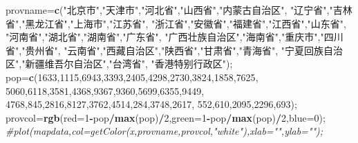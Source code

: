 \documentclass[]{article}
\newenvironment{Shaded}{\begin{snugshade}}{\end{snugshade}}
\newcommand{\KeywordTok}[1]{\textcolor[rgb]{0.13,0.29,0.53}{\textbf{#1}}}
\newcommand{\DataTypeTok}[1]{\textcolor[rgb]{0.13,0.29,0.53}{#1}}
\newcommand{\DecValTok}[1]{\textcolor[rgb]{0.00,0.00,0.81}{#1}}
\newcommand{\StringTok}[1]{\textcolor[rgb]{0.31,0.60,0.02}{#1}}
\newcommand{\CommentTok}[1]{\textcolor[rgb]{0.56,0.35,0.01}{\textit{#1}}}
\newcommand{\OperatorTok}[1]{\textcolor[rgb]{0.81,0.36,0.00}{\textbf{#1}}}
\newcommand{\NormalTok}[1]{#1}
\begin{document}
\begin{Shaded}
\begin{Highlighting}[]
\NormalTok{provname=}\KeywordTok{c}\NormalTok{(}\StringTok{"北京市"}\NormalTok{,}\StringTok{"天津市"}\NormalTok{,}\StringTok{"河北省"}\NormalTok{,}\StringTok{"山西省"}\NormalTok{,}\StringTok{"内蒙古自治区"}\NormalTok{,}
                \StringTok{"辽宁省"}\NormalTok{,}\StringTok{"吉林省"}\NormalTok{,}\StringTok{"黑龙江省"}\NormalTok{,}\StringTok{"上海市"}\NormalTok{,}\StringTok{"江苏省"}\NormalTok{,}
                \StringTok{"浙江省"}\NormalTok{,}\StringTok{"安徽省"}\NormalTok{,}\StringTok{"福建省"}\NormalTok{,}\StringTok{"江西省"}\NormalTok{,}\StringTok{"山东省"}\NormalTok{,}
                \StringTok{"河南省"}\NormalTok{,}\StringTok{"湖北省"}\NormalTok{,}\StringTok{"湖南省"}\NormalTok{,}\StringTok{"广东省"}\NormalTok{,}
                \StringTok{"广西壮族自治区"}\NormalTok{,}\StringTok{"海南省"}\NormalTok{,}\StringTok{"重庆市"}\NormalTok{,}\StringTok{"四川省"}\NormalTok{,}\StringTok{"贵州省"}\NormalTok{,}
                \StringTok{"云南省"}\NormalTok{,}\StringTok{"西藏自治区"}\NormalTok{,}\StringTok{"陕西省"}\NormalTok{,}\StringTok{"甘肃省"}\NormalTok{,}\StringTok{"青海省"}\NormalTok{,}
                \StringTok{"宁夏回族自治区"}\NormalTok{,}\StringTok{"新疆维吾尔自治区"}\NormalTok{,}\StringTok{"台湾省"}\NormalTok{,}
                \StringTok{"香港特别行政区"}\NormalTok{);}
\NormalTok{pop=}\KeywordTok{c}\NormalTok{(}\DecValTok{1633}\NormalTok{,}\DecValTok{1115}\NormalTok{,}\DecValTok{6943}\NormalTok{,}\DecValTok{3393}\NormalTok{,}\DecValTok{2405}\NormalTok{,}\DecValTok{4298}\NormalTok{,}\DecValTok{2730}\NormalTok{,}\DecValTok{3824}\NormalTok{,}\DecValTok{1858}\NormalTok{,}\DecValTok{7625}\NormalTok{,}
                \DecValTok{5060}\NormalTok{,}\DecValTok{6118}\NormalTok{,}\DecValTok{3581}\NormalTok{,}\DecValTok{4368}\NormalTok{,}\DecValTok{9367}\NormalTok{,}\DecValTok{9360}\NormalTok{,}\DecValTok{5699}\NormalTok{,}\DecValTok{6355}\NormalTok{,}\DecValTok{9449}\NormalTok{,}
                \DecValTok{4768}\NormalTok{,}\DecValTok{845}\NormalTok{,}\DecValTok{2816}\NormalTok{,}\DecValTok{8127}\NormalTok{,}\DecValTok{3762}\NormalTok{,}\DecValTok{4514}\NormalTok{,}\DecValTok{284}\NormalTok{,}\DecValTok{3748}\NormalTok{,}\DecValTok{2617}\NormalTok{,}
                \DecValTok{552}\NormalTok{,}\DecValTok{610}\NormalTok{,}\DecValTok{2095}\NormalTok{,}\DecValTok{2296}\NormalTok{,}\DecValTok{693}\NormalTok{);}
\NormalTok{provcol=}\KeywordTok{rgb}\NormalTok{(}\DataTypeTok{red=}\DecValTok{1}\OperatorTok{-}\NormalTok{pop}\OperatorTok{/}\KeywordTok{max}\NormalTok{(pop)}\OperatorTok{/}\DecValTok{2}\NormalTok{,}\DataTypeTok{green=}\DecValTok{1}\OperatorTok{-}\NormalTok{pop}\OperatorTok{/}\KeywordTok{max}\NormalTok{(pop)}\OperatorTok{/}\DecValTok{2}\NormalTok{,}\DataTypeTok{blue=}\DecValTok{0}\NormalTok{);}
\CommentTok{#plot(mapdata,col=getColor(x,provname,provcol,"white"),xlab="",ylab="");}
\end{Highlighting}
\end{Shaded}
\end{document}
